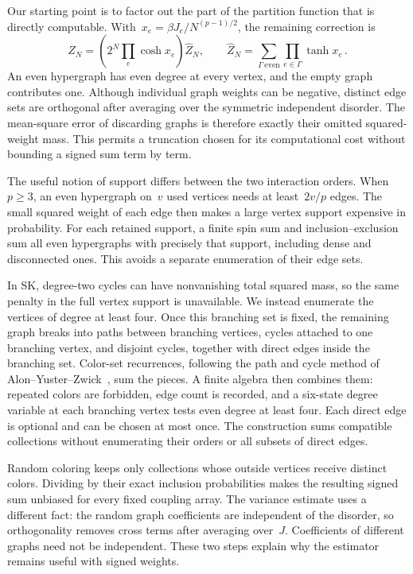 \documentclass[10pt]{article}
\theoremstyle{plain}
\theoremstyle{definition}
\theoremstyle{remark}
\begin{document}
Our starting point is to factor out the part of the partition function that is directly computable. With~$x_e=\beta J_e/N^{(p-1)/2}$, the remaining correction is
\begin{equation}\label{eq:overview-graphical}
 Z_N=\left(2^N\prod_e\cosh x_e\right)\hat Z_N,\qquad
 \hat Z_N=\sum_{\Gamma\ \mathrm{even}}\prod_{e\in\Gamma}\tanh x_e\,.
\end{equation}
An even hypergraph has even degree at every vertex, and the empty graph contributes one. Although individual graph weights can be negative, distinct edge sets are orthogonal after averaging over the symmetric independent disorder. The mean-square error of discarding graphs is therefore exactly their omitted squared-weight mass. This permits a truncation chosen for its computational cost without bounding a signed sum term by term.

The useful notion of support differs between the two interaction orders. When~$p\ge3$, an even hypergraph on~$v$ used vertices needs at least~$2v/p$ edges. The small squared weight of each edge then makes a large vertex support expensive in probability. For each retained support, a finite spin sum and inclusion--exclusion sum all even hypergraphs with precisely that support, including dense and disconnected ones. This avoids a separate enumeration of their edge sets.

In SK, degree-two cycles can have nonvanishing total squared mass, so the same penalty in the full vertex support is unavailable. We instead enumerate the vertices of degree at least four. Once this branching set is fixed, the remaining graph breaks into paths between branching vertices, cycles attached to one branching vertex, and disjoint cycles, together with direct edges inside the branching set. Color-set recurrences, following the path and cycle method of Alon--Yuster--Zwick~\cite{AYZ95}, sum the pieces. A finite algebra then combines them: repeated colors are forbidden, edge count is recorded, and a six-state degree variable at each branching vertex tests even degree at least four. Each direct edge is optional and can be chosen at most once. The construction sums compatible collections without enumerating their orders or all subsets of direct edges.

Random coloring keeps only collections whose outside vertices receive distinct colors. Dividing by their exact inclusion probabilities makes the resulting signed sum unbiased for every fixed coupling array. The variance estimate uses a different fact: the random graph coefficients are independent of the disorder, so orthogonality removes cross terms after averaging over~$J$. Coefficients of different graphs need not be independent. These two steps explain why the estimator remains useful with signed weights.
\end{document}
